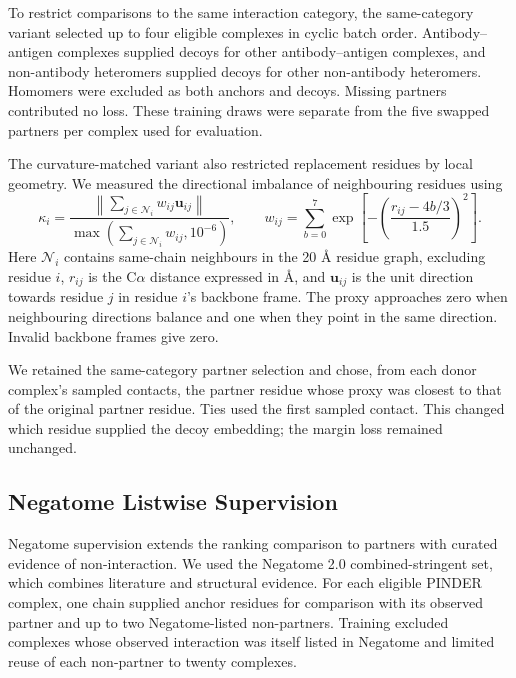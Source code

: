 To restrict comparisons to the same interaction category, the same-category variant selected up to four eligible complexes in cyclic batch order. Antibody--antigen complexes supplied decoys for other antibody--antigen complexes, and non-antibody heteromers supplied decoys for other non-antibody heteromers. Homomers were excluded as both anchors and decoys. Missing partners contributed no loss. These training draws were separate from the five swapped partners per complex used for evaluation.

The curvature-matched variant also restricted replacement residues by local geometry. We measured the directional imbalance of neighbouring residues using
\begin{equation}
    \kappa_i=
    \frac{\left\|\sum_{j\in\mathcal N_i}w_{ij}\mathbf u_{ij}\right\|}
    {\max\!\left(\sum_{j\in\mathcal N_i}w_{ij},10^{-6}\right)},
    \qquad
    w_{ij}=\sum_{b=0}^{7}
    \exp\!\left[-\left(\frac{r_{ij}-4b/3}{1.5}\right)^2\right].
    \label{eq:jaxka-curvature-proxy}
\end{equation}
Here $\mathcal N_i$ contains same-chain neighbours in the 20 \AA{} residue graph, excluding residue $i$, $r_{ij}$ is the C$\alpha$ distance expressed in \AA{}, and $\mathbf u_{ij}$ is the unit direction towards residue $j$ in residue $i$'s backbone frame. The proxy approaches zero when neighbouring directions balance and one when they point in the same direction. Invalid backbone frames give zero.

We retained the same-category partner selection and chose, from each donor complex's sampled contacts, the partner residue whose proxy was closest to that of the original partner residue. Ties used the first sampled contact. This changed which residue supplied the decoy embedding; the margin loss remained unchanged.

\subsection{Negatome Listwise Supervision}
\label{app:jaxka-negatome-loss}

Negatome supervision extends the ranking comparison to partners with curated evidence of non-interaction. We used the Negatome 2.0 combined-stringent set, which combines literature and structural evidence.\supercite{blohmNegatomeDatabaseNoninteracting2014} For each eligible PINDER complex, one chain supplied anchor residues for comparison with its observed partner and up to two Negatome-listed non-partners. Training excluded complexes whose observed interaction was itself listed in Negatome and limited reuse of each non-partner to twenty complexes.

